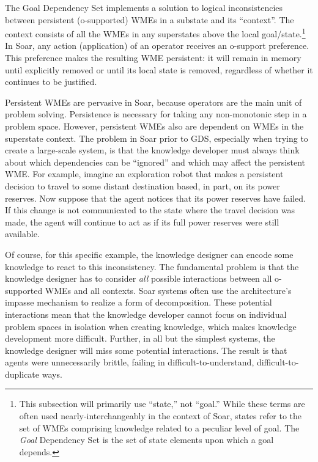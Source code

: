 The Goal Dependency Set implements a solution to logical inconsistencies between persistent (o-supported) WMEs in a substate and its ``context''. The context consists of all the WMEs in any superstates above the local goal/state.\footnote{
	This subsection will primarily use ``state,'' not ``goal.'' While these terms are often used nearly-interchangeably in the context of Soar, states refer to the set of WMEs comprising knowledge related to a peculiar level of goal. The \textit{Goal} Dependency Set is the set of state elements upon which a goal depends.}
In Soar, any action (application) of an operator receives an o-support preference. This preference makes the resulting WME persistent: it will remain in memory until explicitly removed or until its local state is removed, regardless of whether it continues to be justified.

Persistent WMEs are pervasive in Soar, because operators are the main unit of problem solving. Persistence is necessary for taking any non-monotonic step in a problem space. However, persistent WMEs also are dependent on WMEs in the superstate context. The problem in Soar prior to GDS, especially when trying to create a large-scale system\cite{Jones99:Automated}, is that the knowledge developer must always think about which dependencies can be ``ignored'' and which may affect the persistent WME. For example, imagine an exploration robot that makes a persistent decision to travel to some distant destination based, in part, on its power reserves.  Now suppose that the agent notices that its power reserves have failed.  If this change is not communicated to the state where the travel decision was made, the agent will continue to act as if its full power reserves were still available.

Of course, for this specific example, the knowledge designer can encode some knowledge to react to this inconsistency. The fundamental problem is that the knowledge designer has to consider \emph{all} possible interactions between all o-supported WMEs and all contexts. Soar systems often use the architecture's impasse mechanism to realize a form of decomposition. These potential interactions mean that the knowledge developer cannot focus on individual problem spaces in isolation when creating knowledge, which makes knowledge development more difficult. Further, in all but the simplest systems, the knowledge designer will miss some potential interactions. The result is that agents were unnecessarily brittle, failing in difficult-to-understand, difficult-to-duplicate ways.  

